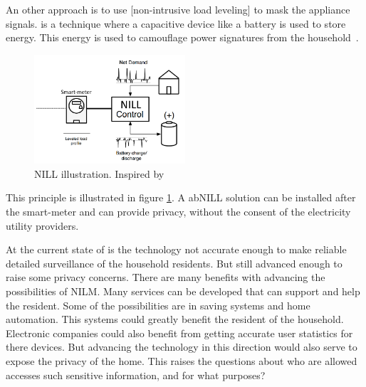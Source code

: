 An other approach is to use [non-intrusive load leveling] to mask the appliance signals.  is a technique where a capacitive device like a battery is used to store energy. This energy is used to camouflage power signatures from the household~\citep{RefWorks:36}. 

\begin{figure}[H]
\centering
\includegraphics[width=0.5\textwidth]{billeder/NILLILU.png}
\caption{NILL illustration. Inspired by \citep{RefWorks:36}}
\label{fig:NILL}
\end{figure}

This principle is illustrated in figure \ref{fig:NILL}. A ab{NILL} solution can be installed after the smart-meter and can provide privacy, without the consent of the electricity utility providers.

At the current state of  is the technology not accurate enough to make reliable detailed surveillance of the household residents. But still advanced enough to raise some privacy concerns. There are many benefits with advancing the possibilities of NILM. Many services can be developed that can support and help the resident. Some of the possibilities are in saving systems and home automation. This systems could greatly benefit the resident of the household. Electronic companies could also benefit from getting accurate user statistics for there devices. But advancing the technology in this direction would also serve to expose the privacy of the home. This raises the questions about who are allowed accesses such sensitive information, and for what purposes?